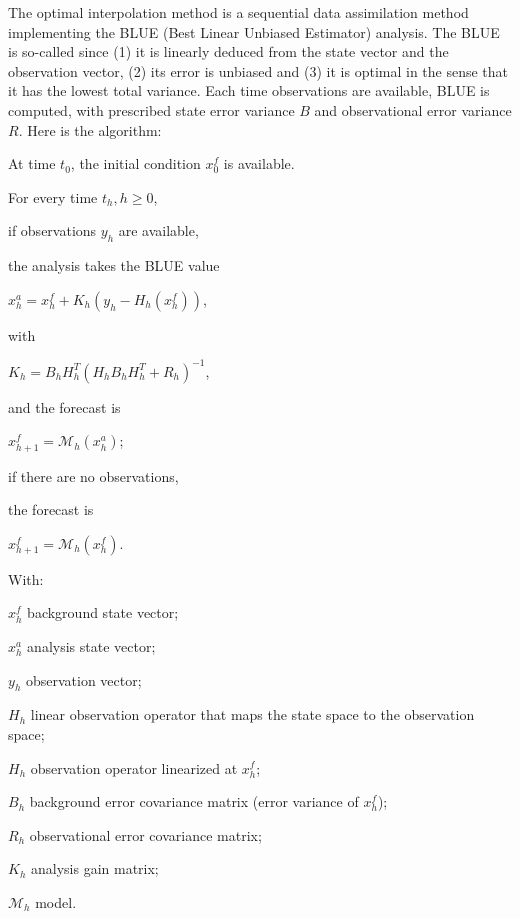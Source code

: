 \documentclass{tufte-book}
\begin{document}
\-The optimal interpolation method is a sequential data assimilation method implementing the \-B\-L\-U\-E (\-Best \-Linear \-Unbiased \-Estimator) analysis. \-The \-B\-L\-U\-E is so-\/called since (1) it is linearly deduced from the state vector and the observation vector, (2) its error is unbiased and (3) it is optimal in the sense that it has the lowest total variance. \-Each time observations are available, \-B\-L\-U\-E is computed, with prescribed state error variance $B$ and observational error variance $R$. \-Here is the algorithm\-: \par



\begin{DoxyEnumerate}
\item \-At time $t_0$, the initial condition $x^{f}_{0}$ is available.
\item \-For every time $t_h, h \ge 0$,
\begin{DoxyItemize}
\item if observations $y_h$ are available, \par
 the analysis takes the \-B\-L\-U\-E value \par
 $x_h^a = x_h^f + K_h(y_h - H_h(x_h^f))$, \par
 with \par
 $K_h = B_hH_h^{T}(H_hB_hH_h^{T} + R_h)^{-1}$, \par
 and the forecast is \par
 $x_{h+1}^f = \mathcal{M}_h(x_h^a)$;
\item if there are no observations, \par
 the forecast is \par
 $x_{h+1}^f = \mathcal{M}_h(x_h^f)$.
\end{DoxyItemize}
\end{DoxyEnumerate}\-With\-: \par
 $x_h^f$ background state vector; \par
 $x_h^a$ analysis state vector; \par
 $y_h$ observation vector; \par
 $H_h$ linear observation operator that maps the state space to the observation space; \par
 $H_h$ observation operator linearized at $x^f_h$; \par
 $B_h$ background error covariance matrix (error variance of $x_h^f$); \par
 $R_h$ observational error covariance matrix; \par
 $K_h$ analysis gain matrix; \par
 $\mathcal{M}_h$ model.
\end{document}
